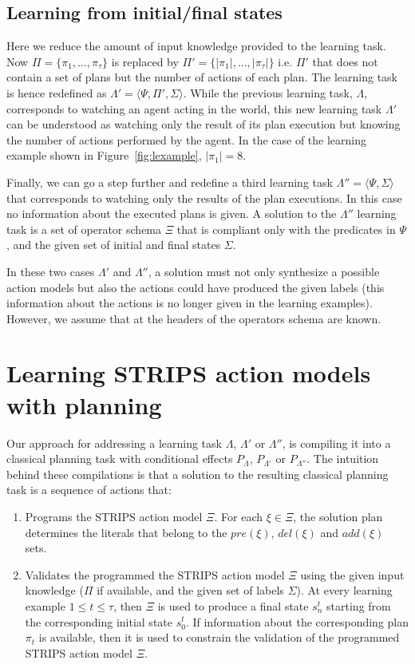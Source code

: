 \documentclass[letterpaper]{article} %
\newcommand{\tup}[1]{{\langle #1 \rangle}}
\begin{document}
\subsection{Learning from initial/final states}
Here we reduce the amount of input knowledge provided to the learning task. Now $\Pi=\{\pi_1,\ldots,\pi_{\tau}\}$ is replaced by $\Pi'=\{|\pi_1|,\ldots,|\pi_{\tau}|\}$ i.e. $\Pi'$ that does not contain a set of plans but the number of actions of each plan. The learning task is hence redefined as $\Lambda'=\tup{\Psi,\Pi',\Sigma}$. While the previous learning task, $\Lambda$, corresponds to watching an agent acting in the world, this new learning task $\Lambda'$ can be understood as watching only the result of its plan execution but knowing the number of actions performed by the agent. In the case of the learning example shown in Figure~\ref{fig:lexample}, $|\pi_1|=8$. 

Finally, we can go a step further and redefine a third learning task $\Lambda''=\tup{\Psi,\Sigma}$ that corresponds to watching only the results of the plan executions. In this case no information about the executed plans is given. A solution to the $\Lambda''$ learning task is a set of operator schema $\Xi$ that is compliant only with the predicates in $\Psi$, and the given set of initial and final states $\Sigma$.

In these two cases $\Lambda'$ and $\Lambda''$, a solution must not only synthesize a possible action models but also the actions could have produced the given labels (this information about the actions is no longer given in the learning examples). However, we assume that at the headers of the operators schema are known. 


\section{Learning STRIPS action models with planning}
Our approach for addressing a learning task $\Lambda$, $\Lambda'$ or $\Lambda''$, is compiling it into a classical planning task with conditional effects $P_{\Lambda}$, $P_{\Lambda'}$ or $P_{\Lambda''}$. The intuition behind these compilations is that a solution to the resulting classical planning task is a sequence of actions that:
\begin{enumerate}
\item Programs the STRIPS action model $\Xi$. For each $\xi\in\Xi$, the solution plan determines the literals that belong to the $pre(\xi)$, $del(\xi)$ and $add(\xi)$ sets.
\item Validates the programmed the STRIPS action model $\Xi$ using the given input knowledge ($\Pi$ if available, and the given set of labels $\Sigma$).  At every learning example {\small $1\leq t\leq \tau$}, then $\Xi$ is used to produce a final state $s_{n}^t$ starting from the corresponding initial state $s_0^t$. If information about the corresponding plan $\pi_t$ is available, then it is used to constrain the validation of the programmed STRIPS action model $\Xi$.
\end{enumerate}
\end{document}
